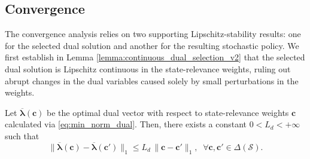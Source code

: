 \documentclass[sglanonrev]{informs4}
\providecommand{\bc}{\boldsymbol{c}}
\providecommand{\blambda}{\boldsymbol{\lambda}}
\begin{document}
\subsection{Convergence} 
\label{sec:convergence}

The convergence analysis relies on two supporting Lipschitz-stability results: one for the selected dual solution and another for the resulting stochastic policy. We first establish in Lemma \ref{lemma:continuous_dual_selection_v2} that the selected dual solution is Lipschitz continuous in the state-relevance weights, ruling out abrupt changes in the dual variables caused solely by small perturbations in the weights.

\begin{lemma}
\label{lemma:continuous_dual_selection_v2}

Let $\overline{\blambda}(\bc)$ be the optimal dual vector with respect to state-relevance weights $\bc$ calculated via \eqref{eq:min_norm_dual}. Then, there exists a constant $0<L_{d}<+\infty$ such that
\[
\lVert \overline{\blambda}(\bc)-\overline{\blambda}(\bc') \rVert_1
\le 
L_{d} \, \lVert \bc-\bc' \rVert_1,
\;\; \forall \bc,\bc'\in \Delta(\mathcal{S}).
\]
\end{lemma}
%
\end{document}

